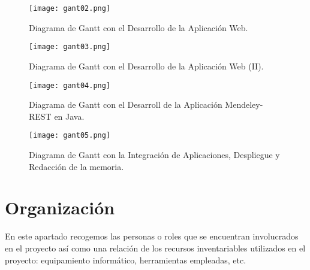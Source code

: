 \begin{figure}[h!]
	\begin{center}
		\texttt{[image: gant02.png]}
		\caption{Diagrama de Gantt con el Desarrollo de la Aplicación Web.}
		\label{fig:gantt02}
	\end{center}
\end{figure}

\begin{figure}[h!]
	\begin{center}
		\texttt{[image: gant03.png]}
		\caption{Diagrama de Gantt con el Desarrollo de la Aplicación Web (II).}
		\label{fig:gantt03}
	\end{center}
\end{figure}

\begin{figure}[h!]
	\begin{center}
		\texttt{[image: gant04.png]}
		\caption{Diagrama de Gantt con el Desarroll de la Aplicación Mendeley-REST en Java.}
		\label{fig:gantt04}
	\end{center}
\end{figure}

\begin{figure}[h!]
	\begin{center}
		\texttt{[image: gant05.png]}
		\caption{Diagrama de Gantt con la Integración de Aplicaciones, Despliegue y Redacción de la memoria.}
		\label{fig:gantt05}
	\end{center}
\end{figure}





\section{Organización}
En este apartado recogemos las personas o roles que se encuentran involucrados en el proyecto así como una relación de los recursos inventariables utilizados en el proyecto: equipamiento informático, herramientas empleadas, etc.

